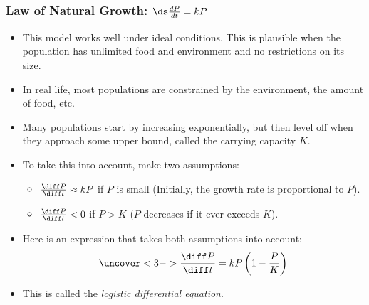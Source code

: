 \begin{frame}
\frametitle{Law of Natural Growth: $ \ds \frac{dP}{dt}=kP$}
\begin{itemize}
\item  This model works well under ideal conditions. This is plausible when the population has unlimited food and environment and no restrictions on its size.
\item  In real life, most populations are constrained by the environment, the amount of food, etc.
\item  Many populations start by increasing exponentially, but then level off when they approach some upper bound, called the carrying capacity $K$.
\item<2->  To take this into account, make two assumptions:
\begin{itemize}
\item<2->  $\frac{\diff P}{\diff t} \approx kP$ if $P$ is small (Initially, the growth rate is proportional to $P$).
\item<2->  $\frac{\diff P}{\diff t} < 0$ if $P > K$ ($P$ decreases if it ever exceeds $K$).
\end{itemize}
\item<3->  Here is an expression that takes both assumptions into account:
\[
\uncover<3->{%
\frac{\diff P}{\diff t} = kP\left( 1 - \frac{P}{K}\right)
}%
\]
\item<3->  This is called the \textit{logistic differential equation}.
\end{itemize}
\end{frame}
